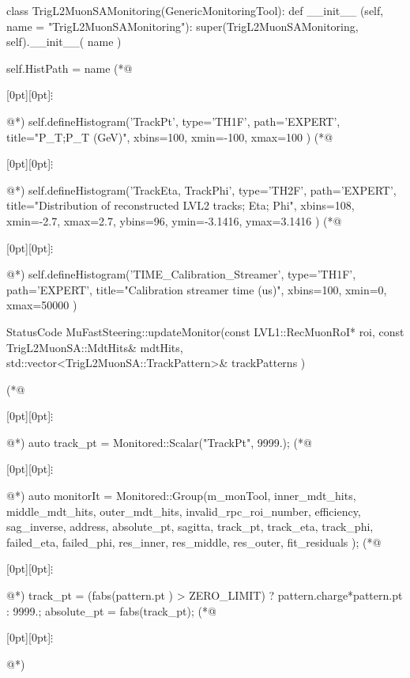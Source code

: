 \begin{python}[caption={Fragment kodu konfiguracji Athena Python~\cite{histogram-declaration}, zawierającego deklarację histogramów przedstawionych na \figref{fig:athena:histogram_TH1}, \figref{fig:athena:histogram_TH1_time} i \figref{fig:athena:histogram_TH2}}, label={lst:athena:histogram_declaration}]
class TrigL2MuonSAMonitoring(GenericMonitoringTool):
    def __init__ (self, name = "TrigL2MuonSAMonitoring"):
        super(TrigL2MuonSAMonitoring, self).__init__( name )
    
        self.HistPath = name
(*@\centerline{\raisebox{-1pt}[0pt][0pt]{$\vdots$}}@*)
        self.defineHistogram('TrackPt', type='TH1F', path='EXPERT', title="P_{T};P_{T} (GeV)", xbins=100, xmin=-100, xmax=100 )
(*@\centerline{\raisebox{-1pt}[0pt][0pt]{$\vdots$}}@*)
        self.defineHistogram('TrackEta, TrackPhi', type='TH2F', path='EXPERT', title="Distribution of reconstructed LVL2 tracks; Eta; Phi", xbins=108, xmin=-2.7, xmax=2.7, ybins=96, ymin=-3.1416, ymax=3.1416 )
(*@\centerline{\raisebox{-1pt}[0pt][0pt]{$\vdots$}}@*)
        self.defineHistogram('TIME_Calibration_Streamer', type='TH1F', path='EXPERT', title="Calibration streamer time (us)", xbins=100, xmin=0, xmax=50000 )
\end{python}

\begin{cpp}[caption={Fragment kodu algorytmu~\cite{histogram-fill}, odpowiadającego za wypełnienie histogramu przedstawionego na \figref{fig:athena:histogram_TH1}, za pomocą zmiennej monitorowanej `TrackPt`.}, label={lst:athena:track_pt}]
StatusCode MuFastSteering::updateMonitor(const LVL1::RecMuonRoI* roi,
  const TrigL2MuonSA::MdtHits& mdtHits,
  std::vector<TrigL2MuonSA::TrackPattern>& trackPatterns )
{
(*@\centerline{\raisebox{-1pt}[0pt][0pt]{$\vdots$}}@*)
  auto track_pt 	= Monitored::Scalar("TrackPt", 9999.);
(*@\centerline{\raisebox{-1pt}[0pt][0pt]{$\vdots$}}@*)
  auto monitorIt	= Monitored::Group(m_monTool, inner_mdt_hits, middle_mdt_hits, outer_mdt_hits, invalid_rpc_roi_number, efficiency, sag_inverse, address, absolute_pt, sagitta, track_pt, track_eta, track_phi, failed_eta, failed_phi, res_inner, res_middle, res_outer, fit_residuals );
(*@\centerline{\raisebox{-1pt}[0pt][0pt]{$\vdots$}}@*)
  track_pt = (fabs(pattern.pt ) > ZERO_LIMIT) ? pattern.charge*pattern.pt : 9999.;
  absolute_pt = fabs(track_pt);
(*@\centerline{\raisebox{-1pt}[0pt][0pt]{$\vdots$}}@*)
}
\end{cpp}

